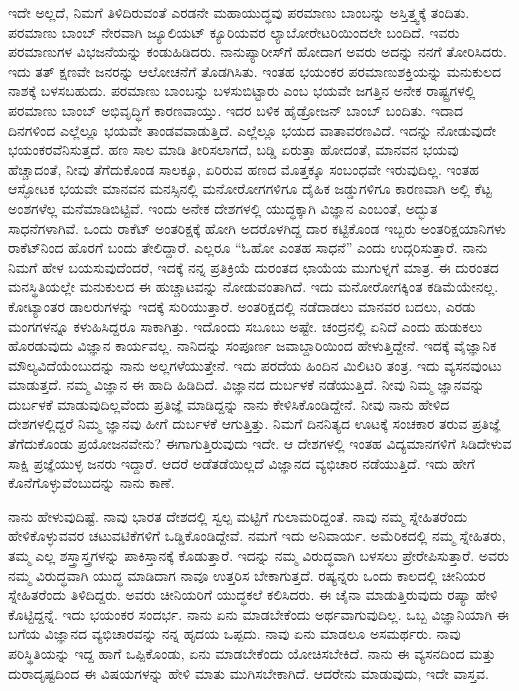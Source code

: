 ಇದೇ ಅಲ್ಲದೆ, ನಿಮಗೆ ತಿಳಿದಿರುವಂತೆ ಎರಡನೇ ಮಹಾಯುದ್ಧವು ಪರಮಾಣು ಬಾಂಬನ್ನು ಅಸ್ತಿತ್ತ್ವಕ್ಕೆ ತಂದಿತು. ಪರಮಾಣು ಬಾಂಬ್ ನೇರವಾಗಿ ಜ್ಯೂಲಿಯಟ್ ಕ್ಯೂರಿಯವರ ಲ್ಯಾಬೋರೇಟರಿ\-ಯಿಂದಲೇ ಬಂದಿದೆ. ಇವರು ಪರಮಾಣುಗಳ ವಿಭಜನೆಯನ್ನು ಕಂಡುಹಿಡಿದರು. ನಾನು\break ಪ್ಯಾರೀಸ್‍ಗೆ ಹೋದಾಗ ಅವರು ಅದನ್ನು ನನಗೆ ತೋರಿಸಿದರು. ಇದು ತತ್ ಕ್ಷಣವೇ ಜನರನ್ನು ಆಲೋಚನೆಗೆ ತೊಡಗಿಸಿತು. ಇಂತಹ ಭಯಂಕರ ಪರಮಾಣುಶಕ್ತಿಯನ್ನು ಮನುಕುಲದ ನಾಶಕ್ಕೆ ಬಳಸಬಹುದು. ಪರಮಾಣು ಬಾಂಬನ್ನು ಬಳಸುಬಿಟ್ಟಾರು ಎಂಬ ಭಯವೇ ಜಗತ್ತಿನ ಅನೇಕ ರಾಷ್ಟ್ರಗಳಲ್ಲಿ ಪರಮಾಣು ಬಾಂಬ್ ಅಭಿವೃದ್ಧಿಗೆ ಕಾರಣವಾಯ್ತು. ಇದರ ಬಳಿಕ ಹೈಡ್ರೋಜನ್ ಬಾಂಬ್ ಬಂದಿತು. ಇದಾದ ದಿನಗಳಿಂದ ಎಲ್ಲೆಲ್ಲೂ ಭಯವೇ ತಾಂಡವವಾಡುತ್ತಿದೆ. ಎಲ್ಲೆಲ್ಲೂ ಭಯದ ವಾತಾವರಣವಿದೆ. ಇದನ್ನು ನೋಡುವುದೇ ಭಯಂಕರವೆನಿಸುತ್ತದೆ. ಹಣ ಸಾಲ ಮಾಡಿ ತೀರಿಸಲಾಗದೆ, ಬಡ್ಡಿ ಏರುತ್ತಾ ಹೋದಂತೆ, ಮಾನವನ ಭಯವು ಹೆಚ್ಚಾದಂತೆ, ನೀವು ತೆಗೆದುಕೊಂಡ ಸಾಲಕ್ಕೂ, ಏರಿರುವ ಹಣದ ಮೊತ್ತಕ್ಕೂ ಸಂಬಂಧವೇ ಇರುವುದಿಲ್ಲ. ಇಂತಹ ಆಸ್ಫೋಟಕ ಭಯವೇ ಮಾನವನ ಮನಸ್ಸಿನಲ್ಲಿ ಮನೋರೋಗಗಳಿಗೂ ದೈಹಿಕ ಜಡ್ಡುಗಳಿಗೂ ಕಾರಣವಾಗಿ ಅಲ್ಲಿ ಕೆಟ್ಟ ಅಂಶಗಳೆಲ್ಲ ಮನೆಮಾಡಿಬಿಟ್ಟಿವೆ. ಇಂದು ಅನೇಕ ದೇಶಗಳಲ್ಲಿ ಯುದ್ಧಕ್ಕಾಗಿ ವಿಜ್ಞಾನ ಎಂಬಂತೆ, ಅದ್ಭುತ ಸಾಧನೆಗಳಾಗಿವೆ. ಒಂದು ರಾಕೆಟ್ ಅಂತರಿಕ್ಷಕ್ಕೆ ಹೋಗಿ ಅದರೊಳಗಿದ್ದ ದಾರ ಕಟ್ಟಿಕೊಂಡ ಇಬ್ಬರು ಅಂತರಿಕ್ಷಯಾನಿಗಳು ರಾಕೆಟ್‍ನಿಂದ ಹೊರಗೆ ಬಂದು ತೇಲಿದ್ದಾರೆ. ಎಲ್ಲರೂ “ಓಹೋ ಎಂತಹ ಸಾಧನೆ” ಎಂದು ಉದ್ಗರಿಸುತ್ತಾರೆ. ನಾನು ನಿಮಗೆ ಹೇಳ ಬಯಸುವುದೆಂದರೆ, ಇದಕ್ಕೆ ನನ್ನ ಪ್ರತಿಕ್ರಿಯೆ ದುರಂತದ ಛಾಯೆಯ ಮುಗುಳ್ನಗೆ ಮಾತ್ರ. ಈ ದುರಂತದ ಮನಸ್ಥಿತಿಯಲ್ಲೇ ಮನುಕುಲದ ಈ ಹುಚ್ಚಾಟವನ್ನು ನೋಡುವಂತಾಗಿದೆ. ಇದು ಮನೋರೋಗಕ್ಕಿಂತ ಕಡಿಮೆಯೇನಲ್ಲ. ಕೋಟ್ಯಾಂತರ ಡಾಲರುಗಳನ್ನು ಇದಕ್ಕೆ ಸುರಿಯುತ್ತಾರೆ. ಅಂತರಿಕ್ಷದಲ್ಲಿ ನಡೆದಾಡಲು ಮಾನವರ ಬದಲು, ಎರಡು ಮಂಗಗಳನ್ನೂ ಕಳುಹಿಸಿದ್ದರೂ ಸಾಕಾಗಿತ್ತು. ಇದೊಂದು ಸಬೂಬು ಅಷ್ಟೇ. ಚಂದ್ರನಲ್ಲಿ ಏನಿದೆ ಎಂದು ಹುಡುಕಲು ಹೊರಡುವುದು ವಿಜ್ಞಾನ ಕಾರ್ಯವಲ್ಲ. ನಾನಿದನ್ನು ಸಂಪೂರ್ಣ ಜವಾಬ್ದಾರಿಯಿಂದ ಹೇಳುತ್ತಿದ್ದೇನೆ. ಇದಕ್ಕೆ ವೈಜ್ಞಾನಿಕ ಮೌಲ್ಯವಿದೆಯೆಂಬುದನ್ನು ನಾನು ಅಲ್ಲಗಳೆಯುತ್ತೇನೆ. ಇದು ಪರದೆಯ ಹಿಂದಿನ ಮಿಲಿಟರಿ ತಂತ್ರ. ಇದು ವ್ಯಸನವುಂಟು ಮಾಡುತ್ತದೆ. ನಮ್ಮ ವಿಜ್ಞಾನ ಈ ಹಾದಿ ಹಿಡಿದಿದೆ. ವಿಜ್ಞಾನದ ದುರ್ಬಳಕೆ ನಡೆಯುತ್ತಿದೆ. ನೀವು ನಿಮ್ಮ ಜ್ಞಾನವನ್ನು ದುರ್ಬಳಕೆ ಮಾಡುವುದಿಲ್ಲವೆಂದು ಪ್ರತಿಜ್ಞೆ ಮಾಡಿದ್ದನ್ನು ನಾನು ಕೇಳಿಸಿಕೊಂಡಿದ್ದೇನೆ. ನೀವು ನಾನು ಹೇಳಿದ ದೇಶಗಳಲ್ಲಿದ್ದರೆ ನಿಮ್ಮ ಜ್ಞಾನವು ಹೀಗೆ ದುರ್ಬಳಕೆ ಆಗುತ್ತಿತ್ತು. ನಿಮಗೆ ದಿನನಿತ್ಯದ ಊಟಕ್ಕೆ ಸಂಚಕಾರ ತರುವ ಪ್ರತಿಜ್ಞೆ ತೆಗೆದುಕೊಂಡು ಪ್ರಯೋಜನವೇನು? ಈಗಾಗುತ್ತಿರುವುದು ಇದೇ. ಆ ದೇಶಗಳಲ್ಲಿ ಇಂತಹ ವಿದ್ಯಮಾನಗಳಿಗೆ ಸಿಡಿದೇಳುವ ಸಾಕ್ಷಿ ಪ್ರಜ್ಞೆಯುಳ್ಳ ಜನರು ಇದ್ದಾರೆ. ಆದರೆ ಅಡೆತಡೆಯಿಲ್ಲದೆ ವಿಜ್ಞಾನದ ವ್ಯಭಿಚಾರ ನಡೆಯುತ್ತಿದೆ. ಇದು ಹೇಗೆ ಕೊನೆಗೊಳ್ಳುವೆಂಬುದನ್ನು ನಾನು ಕಾಣೆ.

ನಾನು ಹೇಳುವುದಿಷ್ಟೆ. ನಾವು ಭಾರತ ದೇಶದಲ್ಲಿ ಸ್ವಲ್ಪ ಮಟ್ಟಿಗೆ ಗುಲಾಮರಿದ್ದಂತೆ. ನಾವು ನಮ್ಮ ಸ್ನೇಹಿತರೆಂದು ಹೇಳಿಕೊಳ್ಳುವವರ ಚಟುವಟಿಕೆಗಳಿಗೆ ಒಡ್ಡಿಕೊಂಡಿದ್ದೇವೆ. ನಮಗೆ ಇದು ಅನಿವಾರ್ಯ. ಅಮೆರಿಕದಲ್ಲಿ ನಮ್ಮ ಸ್ನೇಹಿತರು, ತಮ್ಮ ಎಲ್ಲ ಶಸ್ತ್ರಾಸ್ತ್ರಗಳನ್ನು ಪಾಕಿಸ್ತಾನಕ್ಕೆ ಕೊಡುತ್ತಾರೆ. ಇದನ್ನು ನಮ್ಮ ವಿರುದ್ಧವಾಗಿ ಬಳಸಲು ಪ್ರೇರೇಪಿಸುತ್ತಾರೆ. ಅವರು ನಮ್ಮ ವಿರುದ್ಧವಾಗಿ ಯುದ್ಧ ಮಾಡಿದಾಗ ನಾವೂ ಉತ್ತರಿಸ ಬೇಕಾಗುತ್ತದೆ. ರಷ್ಯನ್ನರು ಒಂದು ಕಾಲದಲ್ಲಿ ಚೀನಿಯರ ಸ್ನೇಹಿತರೆಂದು ತಿಳಿದಿದ್ದರು. ಅವರು ಚೀನಿಯರಿಗೆ ಯುದ್ಧಕಲೆ ಕಲಿಸಿದರು. ಈ ಚೈನಾ ಮಾಡುತ್ತಿರುವುದು ರಷ್ಯಾ ಹೇಳಿ ಕೊಟ್ಟಿದ್ದನ್ನೆ. ಇದು ಭಯಂಕರ ಸಂದರ್ಭ. ನಾನು ಏನು ಮಾಡಬೇಕೆಂದು ಅರ್ಥವಾಗುವುದಿಲ್ಲ. ಒಬ್ಬ ವಿಜ್ಞಾನಿಯಾಗಿ ಈ ಬಗೆಯ ವಿಜ್ಞಾನದ ವ್ಯಭಿಚಾರವನ್ನು ನನ್ನ ಹೃದಯ ಒಪ್ಪದು. ನಾವು ಏನು ಮಾಡಲೂ ಅಸಮರ್ಥರು. ನಾವು ಪರಿಸ್ಥಿತಿಯನ್ನು ಇದ್ದ ಹಾಗೆ ಒಪ್ಪಿಕೊಂಡು, ಏನು ಮಾಡಬೇಕೆಂದು ಯೋಚಿಸಬೇಕಿದೆ. ನಾನು ಈ ವ್ಯಸನದಿಂದ ಮತ್ತು ದುರಾದೃಷ್ಟದಿಂದ ಈ ವಿಷಯಗಳನ್ನು ಹೇಳಿ ಮಾತು ಮುಗಿಸಬೇಕಾಗಿದೆ. ಆದರೇನು ಮಾಡುವುದು, ಇದೇ ವಾಸ್ತವ.

